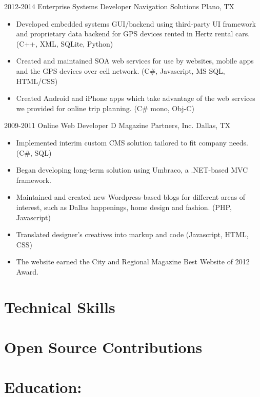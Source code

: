 \documentclass[12pt,sans]{moderncv}
\begin{document}
	\cventry
	{2012-2014}
	{Enterprise Systems Developer}   
	{Navigation Solutions}
	{Plano, TX}{}
	{
		\begin{itemize}
			\item {Developed embedded systems GUI/backend using third-party UI framework and proprietary data backend for GPS devices rented in Hertz rental cars. (C++, XML, SQLite, Python)}
			\item {Created and maintained SOA web services for use by websites, mobile apps and the GPS devices over cell network. (C\#, Javascript, MS SQL, HTML/CSS)}
			\item {Created Android and iPhone apps which take advantage of the web services we provided for online trip planning. (C\# mono, Obj-C)}
		\end{itemize}
	}
	
	\cventry
	{2009-2011}
	{Online Web Developer}   
	{D Magazine Partners, Inc.}
	{Dallas, TX}{}
	{
		\begin{itemize}
			\item {Implemented interim custom CMS solution tailored to fit company needs. (C\#, SQL)}
			\item {Began developing long-term solution using Umbraco, a .NET-based MVC framework.}
			\item {Maintained and created new Wordpress-based blogs for different areas of interest, such as Dallas happenings, home design and fashion. (PHP, Javascript)}
			\item {Translated designer's creatives into markup and code (Javascript, HTML, CSS)}
			\item {The website earned the City and Regional Magazine Best Website of 2012 Award.}
		\end{itemize}
	}
	
	\section{Technical Skills}

	\section{Open Source Contributions}
	\section{Education:}
	
\end{document}
